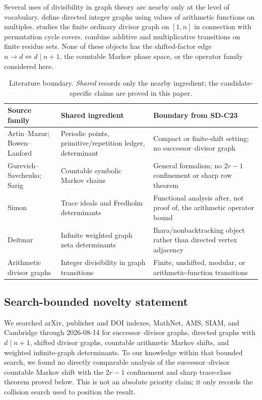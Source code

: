 Several uses of divisibility in graph theory are nearby only at the level of
vocabulary.  \citet{PhunphayapEtAl2025} define directed integer graphs using
values of arithmetic functions on multiples.  \citet{McNew2022} studies the
finite ordinary divisor graph on \([1,n]\) in connection with permutation
cycle covers.  \citet{PeruccaSeureWolff2024} combine additive and
multiplicative transitions on finite residue sets.  None of these objects has
the shifted-factor edge \(n\to d\iff d\mid n+1\), the countable Markov phase
space, or the operator family considered here.

\begin{table}[t]
\centering
\small
\caption{Literature boundary.  \emph{Shared} records only the nearby
ingredient; the candidate-specific claims are proved in this paper.}
\label{tab:literature}
\begin{tabularx}{\textwidth}{@{}L{0.27\textwidth}YY@{}}
\toprule
Source family & Shared ingredient & Boundary from SD-C23\\
\midrule
Artin--Mazur; Bowen--Lanford
  & Periodic points, primitive/repetition ledger, determinant
  & Compact or finite-shift setting; no successor--divisor graph\\
Gurevich--Savchenko; Sarig
  & Countable symbolic Markov chains
  & General formalism; no \(2r-1\) confinement or sharp row theorem\\
Simon
  & Trace ideals and Fredholm determinants
  & Functional analysis after, not proof of, the arithmetic operator bound\\
Deitmar
  & Infinite weighted graph zeta determinants
  & Ihara/nonbacktracking object rather than directed vertex adjacency\\
Arithmetic divisor graphs
  & Integer divisibility in graph transitions
  & Finite, unshifted, modular, or arithmetic-function transitions\\
\bottomrule
\end{tabularx}
\end{table}

\subsection{Search-bounded novelty statement}

We searched arXiv, publisher and DOI indexes, MathNet, AMS, SIAM, and
Cambridge through 2026-08-14 for successor--divisor graphs, directed graphs
with \(d\mid n+1\), shifted divisor graphs, countable arithmetic Markov
shifts, and weighted infinite-graph determinants.  To our knowledge within
that bounded search, we found no directly comparable analysis of the
successor--divisor countable Markov shift with the \(2r-1\) confinement and
sharp trace-class theorem proved below.  This is not an absolute priority
claim; it only records the collision search used to position the result.
